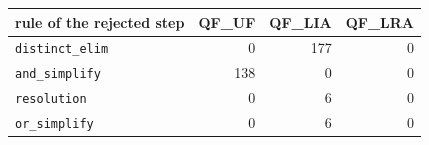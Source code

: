 \begin{tabular}{lrrr}
\toprule
rule of the rejected step & QF\_UF & QF\_LIA & QF\_LRA \\
\midrule
\texttt{distinct\_elim} & 0 & 177 & 0 \\
\texttt{and\_simplify} & 138 & 0 & 0 \\
\texttt{resolution} & 0 & 6 & 0 \\
\texttt{or\_simplify} & 0 & 6 & 0 \\
\bottomrule
\end{tabular}
